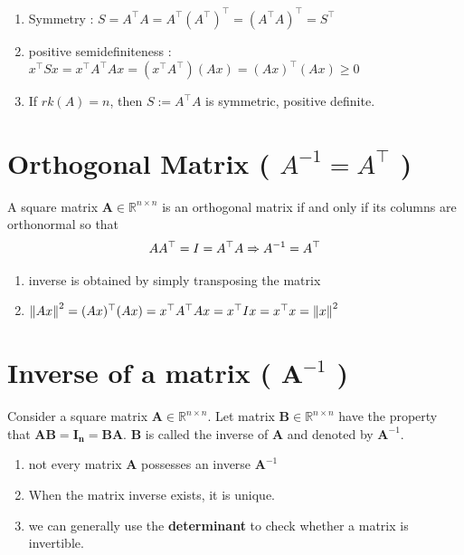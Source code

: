 \begin{enumerate}
    \item Symmetry : $S = A^\top A = A^\top (A^\top )^\top  = (A^\top A)^\top  = S^\top$ 

    \item positive semidefiniteness : $x^\top Sx = x^\top A^\top Ax = (x^\top A^\top )(Ax) = (Ax)^\top (Ax) \geq 0$ 

    \item If $rk(A) = n$, then $S := A^\top A$ is symmetric, positive definite.
\end{enumerate}



\section{Orthogonal Matrix ( $A^{-1} = A^\top$ ) \cite{mfml-1}}\label{Orthogonal Matrix}
A square matrix $\mathbf{A} \in \mathbb{R}^{n\times n}$ is an orthogonal matrix if and only if its columns are orthonormal so that 
\[
    \hfill
    AA^\top  = I = A^\top A  
    \Rightarrow  A^{-1} = A^\top 
    \hfill
\]

\begin{enumerate}
    \item inverse is obtained by simply transposing the matrix

    \item $
        \left\| Ax \right\|^2 
        = (Ax)^\top (Ax) 
        = x^\top A^\top Ax 
        = x^\top Ix 
        = x^\top x 
        = \left\| x \right\|^2
    $
\end{enumerate}


\section{Inverse of a matrix ( $\mathbf{A}^{-1}$ ) \cite{mfml-1}}\label{Inverse of a matrix}

Consider a square matrix $\mathbf{A} \in \mathbb{R}^{n\times n}$. Let matrix $\mathbf{B} \in \mathbb{R}^{n\times n}$ have the property that $\mathbf{AB = I_n = BA}$. $\mathbf{B}$ is called the inverse of $\mathbf{A}$ and denoted by $\mathbf{A}^{-1}$.

\begin{enumerate}
    \item not every matrix $\mathbf{A}$ possesses an inverse $\mathbf{A}^{-1}$

    \item When the matrix inverse exists, it is unique.
    
    \item we can generally use the \textbf{determinant} to check whether a matrix is invertible.
\end{enumerate}

